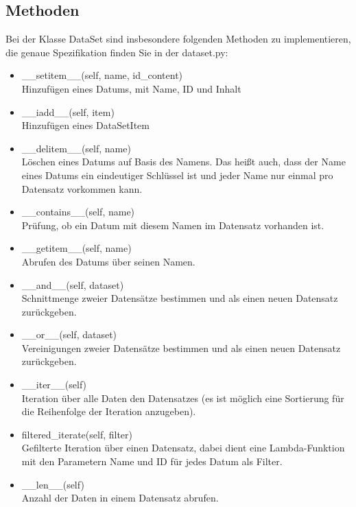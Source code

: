 \documentclass[]{article}
\begin{document}
\subsection{Methoden}
Bei der Klasse \grqq DataSet\grqq{} sind insbesondere folgenden Methoden zu implementieren, die genaue Spezifikation finden Sie in der \grqq dataset.py\grqq :\\
\begin{itemize}
    \item \_\_setitem\_\_(self, name, id\_content)\\
\hspace*{1cm} Hinzufügen eines Datums, mit Name, ID und Inhalt
\item \_\_iadd\_\_(self, item)\\
\hspace*{1cm} Hinzufügen eines \grqq DataSetItem\grqq
\item\_\_delitem\_\_(self, name)\\
\hspace*{1cm}Löschen eines Datums auf Basis des Namens.
Das heißt auch, dass der Name eines Datums ein eindeutiger Schlüssel ist und jeder Name nur einmal pro Datensatz vorkommen kann.
\item \_\_contains\_\_(self, name)\\
\hspace*{1cm} Prüfung, ob ein Datum mit diesem Namen im Datensatz vorhanden ist.
\item \_\_getitem\_\_(self, name)\\
\hspace*{1cm} Abrufen des Datums über seinen Namen.
\item \_\_and\_\_(self, dataset)\\
\hspace*{1cm} Schnittmenge zweier Datensätze bestimmen und als einen neuen Datensatz zurückgeben.
\item \_\_or\_\_(self, dataset)\\
\hspace*{1cm} Vereinigungen zweier Datensätze bestimmen und als einen neuen Datensatz zurückgeben.
\item \_\_iter\_\_(self)\\
\hspace*{1cm} Iteration über alle Daten den Datensatzes (es ist möglich eine Sortierung für die Reihenfolge der Iteration anzugeben).
\item filtered\_iterate(self, filter)\\
\hspace*{1cm} Gefilterte Iteration über einen Datensatz, dabei dient eine Lambda-Funktion mit den Parametern Name und ID für jedes Datum als Filter.
\item \_\_len\_\_(self)\\
\hspace*{1cm} Anzahl der Daten in einem Datensatz abrufen.

\end{itemize}
\end{document}
